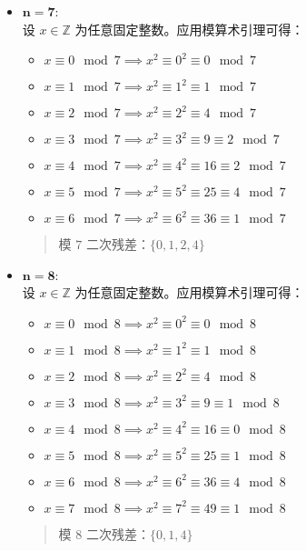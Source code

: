 \begin{example}
\begin{itemize}
        \item $\mathbf{n=7}$:\\
        设 $x \in \mathbb{Z}$ 为任意固定整数。应用模算术引理可得：
        \begin{itemize}
            \item $x \equiv 0 \mod 7 \implies x^2 \equiv 0^2 \equiv 0 \mod 7$
            \item $x \equiv 1 \mod 7 \implies x^2 \equiv 1^2 \equiv 1 \mod 7$
            \item $x \equiv 2 \mod 7 \implies x^2 \equiv 2^2 \equiv 4 \mod 7$
            \item $x \equiv 3 \mod 7 \implies x^2 \equiv 3^2 \equiv 9 \equiv 2 \mod 7$
            \item $x \equiv 4 \mod 7 \implies x^2 \equiv 4^2 \equiv 16 \equiv 2 \mod 7$
            \item $x \equiv 5 \mod 7 \implies x^2 \equiv 5^2 \equiv 25 \equiv 4 \mod 7$
            \item $x \equiv 6 \mod 7 \implies x^2 \equiv 6^2 \equiv 36 \equiv 1 \mod 7$
        \end{itemize}
        \begin{quotation}
            \begin{center}
                \large 模 $7$ 二次残差：$\{0, 1, 2, 4\}$
            \end{center}
        \end{quotation} 

        \item $\mathbf{n=8}$:\\
        设 $x \in \mathbb{Z}$ 为任意固定整数。应用模算术引理可得：
        \begin{itemize}
            \item $x \equiv 0 \mod 8 \implies x^2 \equiv 0^2 \equiv 0 \mod 8$
            \item $x \equiv 1 \mod 8 \implies x^2 \equiv 1^2 \equiv 1 \mod 8$
            \item $x \equiv 2 \mod 8 \implies x^2 \equiv 2^2 \equiv 4 \mod 8$
            \item $x \equiv 3 \mod 8 \implies x^2 \equiv 3^2 \equiv 9 \equiv 1 \mod 8$
            \item $x \equiv 4 \mod 8 \implies x^2 \equiv 4^2 \equiv 16 \equiv 0 \mod 8$
            \item $x \equiv 5 \mod 8 \implies x^2 \equiv 5^2 \equiv 25 \equiv 1 \mod 8$
            \item $x \equiv 6 \mod 8 \implies x^2 \equiv 6^2 \equiv 36 \equiv 4 \mod 8$
            \item $x \equiv 7 \mod 8 \implies x^2 \equiv 7^2 \equiv 49 \equiv 1 \mod 8$
        \end{itemize}
        \begin{quotation}
            \begin{center}
                \large 模 $8$ 二次残差：$\{0, 1, 4\}$
            \end{center}
        \end{quotation}
    \end{itemize}
    

\end{example}
